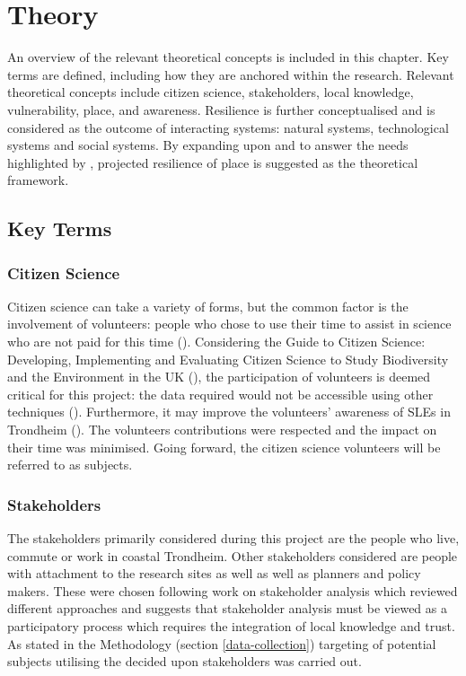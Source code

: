 
\chapter{Theory}


An overview of the relevant theoretical concepts is included in this chapter. Key terms are defined, including how they are anchored within the research. Relevant theoretical concepts include citizen science, stakeholders, local knowledge, vulnerability, place, and awareness. Resilience is further conceptualised and is considered as the outcome of interacting systems: natural systems, technological systems and social systems. By expanding upon \cite{cutter_place-based_2008} and \cite{cutter_community_2020} to answer the needs highlighted by \cite{rasanen_conceptualizing_2020}, projected resilience of place is suggested as the theoretical framework.

\section{Key Terms}


\subsection{Citizen Science}
Citizen science can take a variety of forms, but the common factor is the involvement of volunteers: people who chose to use their time to assist in science who are not paid for this time (\cite{pocock_choosing_2014}). Considering the Guide to Citizen Science: Developing, Implementing and Evaluating Citizen Science to Study Biodiversity and the Environment in the UK (\cite{tweddle_guide_2012}), the participation of volunteers is deemed critical for this project: the data required would not be accessible using other techniques (\cite{tweddle_guide_2012}). Furthermore, it may improve the volunteers' awareness of SLEs in Trondheim (\cite{gerkensmeier_governing_2018}).  The volunteers contributions were respected and the impact on their time was minimised. Going forward, the citizen science volunteers will be referred to as subjects. 

\subsection{Stakeholders}
The stakeholders primarily considered during this project are the people who live, commute or work in coastal Trondheim. Other stakeholders considered are people with attachment to the research sites as well as well as planners and policy makers. These were chosen following \cite{reed_stakeholder_2008} work on stakeholder analysis which reviewed different approaches and suggests that stakeholder analysis must be viewed as a participatory process which requires the integration of local knowledge and trust. As stated in the Methodology (section \ref{data-collection}) targeting of potential subjects utilising the decided upon stakeholders was carried out. 


